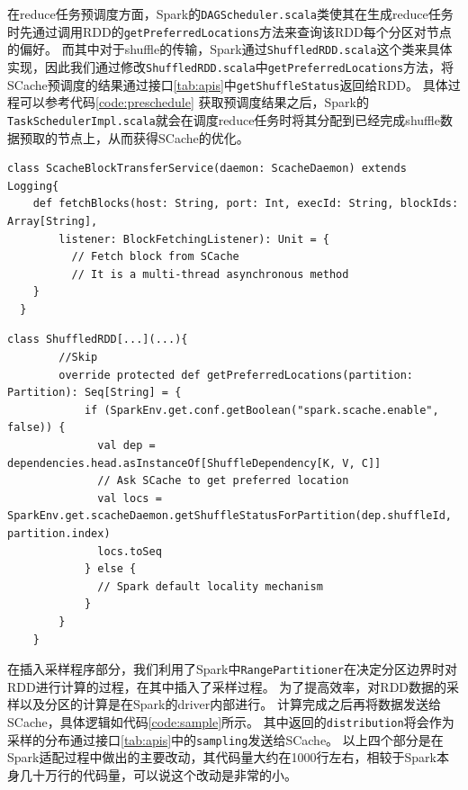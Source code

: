 在reduce任务预调度方面，Spark的\verb|DAGScheduler.scala|类使其在生成reduce任务时先通过调用RDD的\verb|getPreferredLocations|方法来查询该RDD每个分区对节点的偏好。
而其中对于shuffle的传输，Spark通过\verb|ShuffledRDD.scala|这个类来具体实现，因此我们通过修改\verb|ShuffledRDD.scala|中\verb|getPreferredLocations|方法，将SCache预调度的结果通过接口\ref{tab:apis}中\verb|getShuffleStatus|返回给RDD。
具体过程可以参考代码\ref{code:preschedule}
获取预调度结果之后，Spark的\verb|TaskSchedulerImpl.scala|就会在调度reduce任务时将其分配到已经完成shuffle数据预取的节点上，从而获得SCache的优化。

\begin{lstlisting}[style={myScalastyle}, caption={ScacheBlockTransferService代码片段}, label={code:reader}]
  class ScacheBlockTransferService(daemon: ScacheDaemon) extends Logging{
    def fetchBlocks(host: String, port: Int, execId: String, blockIds: Array[String],
        listener: BlockFetchingListener): Unit = {
          // Fetch block from SCache
          // It is a multi-thread asynchronous method 
    }
  }
\end{lstlisting}
\begin{lstlisting}[style={myScalastyle}, caption={Reduce预调度代码片段}, label={code:preschedule}]
    class ShuffledRDD[...](...){
        //Skip
        override protected def getPreferredLocations(partition: Partition): Seq[String] = {
            if (SparkEnv.get.conf.getBoolean("spark.scache.enable", false)) {
              val dep = dependencies.head.asInstanceOf[ShuffleDependency[K, V, C]]
              // Ask SCache to get preferred location
              val locs = SparkEnv.get.scacheDaemon.getShuffleStatusForPartition(dep.shuffleId, partition.index)
              locs.toSeq
            } else {
              // Spark default locality mechanism
            }
        }
    }
\end{lstlisting}

在插入采样程序部分，我们利用了Spark中\verb|RangePartitioner|在决定分区边界时对RDD进行计算的过程，在其中插入了采样过程。
为了提高效率，对RDD数据的采样以及分区的计算是在Spark的driver内部进行。
计算完成之后再将数据发送给SCache，具体逻辑如代码\ref{code:sample}所示。
其中返回的\verb|distribution|将会作为采样的分布通过接口\ref{tab:apis}中的\verb|sampling|发送给SCache。
以上四个部分是在Spark适配过程中做出的主要改动，其代码量大约在1000行左右，相较于Spark本身几十万行的代码量，可以说这个改动是非常的小。

